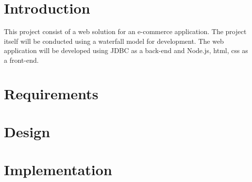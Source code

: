 \documentclass[12pt]{article}
\begin{document}
\begin{myspace}{1.7}
        
\section*{Introduction}  
This project consist of a web solution for an e-commerce application. The project itself will be conducted using a waterfall model\cite{waterfall} for development.  The web application will be developed using JDBC as a back-end and Node.js, html, css  as a front-end. 


%
%
\pagebreak
\section*{Requirements}  



%
%


\pagebreak
\section*{Design}


%
%
\pagebreak
\section*{Implementation}



\end{myspace}
\end{document}
